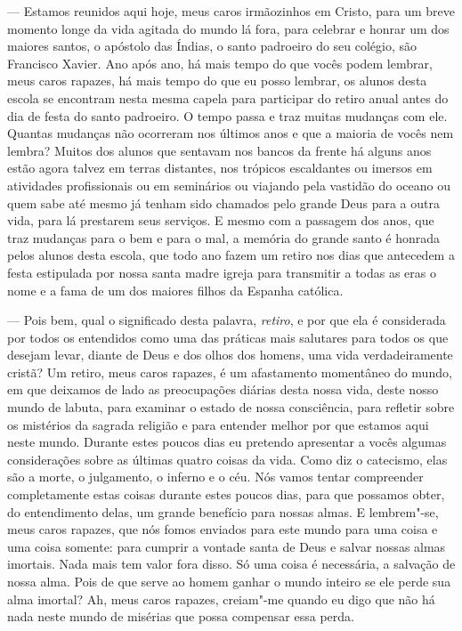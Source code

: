 --- Estamos reunidos aqui hoje, meus caros irmãozinhos em Cristo, para um breve
momento longe da vida agitada do mundo lá fora, para celebrar e honrar
um dos maiores santos, o apóstolo das Índias, o santo padroeiro do seu
colégio, são Francisco Xavier. Ano após ano, há mais tempo do que
vocês podem lembrar, meus caros rapazes, há mais tempo do que eu posso
lembrar, os alunos desta escola se encontram nesta mesma capela para
participar do retiro anual antes do dia de festa do santo padroeiro. O
tempo passa e traz muitas mudanças com ele. Quantas mudanças não
ocorreram nos últimos anos e que a maioria de vocês nem lembra? Muitos
dos alunos que sentavam nos bancos da frente há alguns anos estão agora
talvez em terras distantes, nos trópicos escaldantes ou imersos em
atividades profissionais ou em seminários ou viajando pela vastidão do
oceano ou quem sabe até mesmo já tenham sido chamados pelo grande Deus
para a outra vida, para lá prestarem seus serviços. E mesmo com a
passagem dos anos, que traz mudanças para o bem e para o mal, a memória
do grande santo é honrada pelos alunos desta escola, que todo ano fazem
um retiro nos dias que antecedem a festa estipulada por nossa santa
madre igreja para transmitir a todas as eras o nome e a fama de um dos
maiores filhos da Espanha católica.

 --- Pois bem, qual o significado desta palavra, \textit{retiro}, e por que
ela é considerada por todos os entendidos como uma das práticas mais
salutares para todos os que desejam levar, diante de Deus e dos olhos
dos homens, uma vida verdadeiramente cristã? Um retiro, meus caros
rapazes, é um afastamento momentâneo do mundo, em que deixamos de lado
as preocupações diárias desta nossa vida, deste nosso mundo de labuta,
para examinar o estado de nossa consciência, para refletir sobre os
mistérios da sagrada religião e para entender melhor por que estamos
aqui neste mundo. Durante estes poucos dias eu pretendo apresentar a
vocês algumas considerações sobre as últimas quatro coisas da vida.
Como diz o catecismo, elas são a morte, o julgamento, o inferno e o
céu. Nós vamos tentar compreender completamente estas coisas durante
estes poucos dias, para que possamos obter, do entendimento delas, um
grande benefício para nossas almas. E lembrem"-se, meus caros rapazes,
que nós fomos enviados para este mundo para uma coisa e uma coisa
somente: para cumprir a vontade santa de Deus e salvar nossas almas
imortais. Nada mais tem valor fora disso. Só uma coisa é necessária, a
salvação de nossa alma. Pois de que serve ao homem ganhar o mundo
inteiro se ele perde sua alma imortal? Ah, meus caros rapazes, creiam"-me
quando eu digo que não há nada neste mundo de misérias que possa
compensar essa perda.


